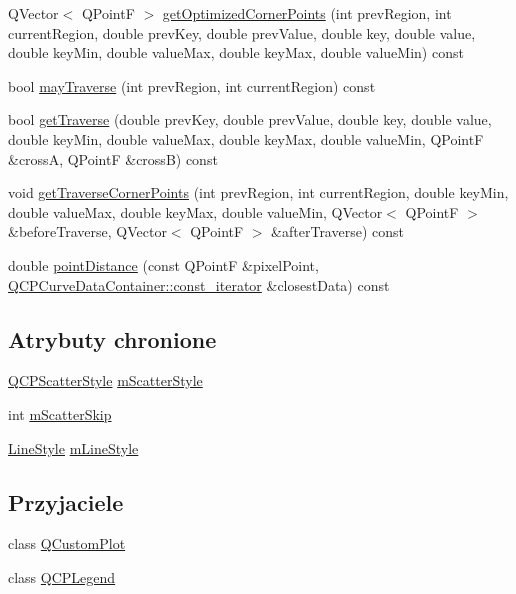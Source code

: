 \begin{DoxyCompactItemize}
\item 
Q\+Vector$<$ Q\+PointF $>$ \hyperlink{class_q_c_p_curve_a929433e67ae3e3770236abea5f1e7a6d}{get\+Optimized\+Corner\+Points} (int prev\+Region, int current\+Region, double prev\+Key, double prev\+Value, double key, double value, double key\+Min, double value\+Max, double key\+Max, double value\+Min) const 
\item 
bool \hyperlink{class_q_c_p_curve_ae5b232c8201441a940516c745309a685}{may\+Traverse} (int prev\+Region, int current\+Region) const 
\item 
bool \hyperlink{class_q_c_p_curve_aa5ba854363f7343c829e37c7d19830cd}{get\+Traverse} (double prev\+Key, double prev\+Value, double key, double value, double key\+Min, double value\+Max, double key\+Max, double value\+Min, Q\+PointF \&crossA, Q\+PointF \&crossB) const 
\item 
void \hyperlink{class_q_c_p_curve_ab231faca0b8d53c19be37c1baea14dd8}{get\+Traverse\+Corner\+Points} (int prev\+Region, int current\+Region, double key\+Min, double value\+Max, double key\+Max, double value\+Min, Q\+Vector$<$ Q\+PointF $>$ \&before\+Traverse, Q\+Vector$<$ Q\+PointF $>$ \&after\+Traverse) const 
\item 
double \hyperlink{class_q_c_p_curve_ad95dda62d82d34271cdd22708a278d97}{point\+Distance} (const Q\+PointF \&pixel\+Point, \hyperlink{class_q_c_p_data_container_ae40a91f5cb0bcac61d727427449b7d15}{Q\+C\+P\+Curve\+Data\+Container\+::const\+\_\+iterator} \&closest\+Data) const 
\end{DoxyCompactItemize}
\subsection*{Atrybuty chronione}
\begin{DoxyCompactItemize}
\item 
\hyperlink{class_q_c_p_scatter_style}{Q\+C\+P\+Scatter\+Style} \hyperlink{class_q_c_p_curve_a08f803b4a30b01bbd7a1eab15d0f864f}{m\+Scatter\+Style}
\item 
int \hyperlink{class_q_c_p_curve_a990bd5fdeb474459f3f6f5ad0a7b945c}{m\+Scatter\+Skip}
\item 
\hyperlink{class_q_c_p_curve_a2710e9f79302152cff794c6e16cc01f1}{Line\+Style} \hyperlink{class_q_c_p_curve_ae1f35ae2b15aee8e15bcdfec5be95156}{m\+Line\+Style}
\end{DoxyCompactItemize}
\subsection*{Przyjaciele}
\begin{DoxyCompactItemize}
\item 
class \hyperlink{class_q_c_p_curve_a1cdf9df76adcfae45261690aa0ca2198}{Q\+Custom\+Plot}
\item 
class \hyperlink{class_q_c_p_curve_a8429035e7adfbd7f05805a6530ad5e3b}{Q\+C\+P\+Legend}
\end{DoxyCompactItemize}
